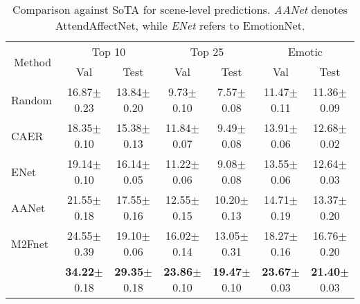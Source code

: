 \begin{table*}[t]
\centering
\tabcolsep=0.07cm
\begin{tabular}{l cc cc cc}
\toprule
\multicolumn{1}{c}{\multirow{2}{*}{Method}} & \multicolumn{2}{c}{Top 10}      & \multicolumn{2}{c}{Top 25}      & \multicolumn{2}{c}{Emotic}      \\
\multicolumn{1}{c}{} & Val   & Test  & Val   & Test  & Val   & Test  \\ \midrule
Random               & 16.87\scriptsize{{$\pm$}0.23} & 13.84\scriptsize{{$\pm$}0.20} & 9.73\scriptsize{{$\pm$}0.10} & 7.57\scriptsize{{$\pm$}0.08} & 11.47\scriptsize{{$\pm$}0.11} & 11.36\scriptsize{{$\pm$}0.09} \\
CAER~\cite{caer}
& 18.35\scriptsize{{$\pm$}0.10} & 15.38\scriptsize{{$\pm$}0.13} & 11.84\scriptsize{{$\pm$}0.07} & 9.49\scriptsize{{$\pm$}0.08}  & 13.91\scriptsize{{$\pm$}0.06} & 12.68\scriptsize{{$\pm$}0.02} \\
ENet~\cite{WeiEmotionNet}
& 19.14\scriptsize{{$\pm$}0.10} & 16.14\scriptsize{{$\pm$}0.05} & 11.22\scriptsize{{$\pm$}0.06} & 9.08\scriptsize{{$\pm$}0.08}  & 13.55\scriptsize{{$\pm$}0.06} & 12.64\scriptsize{{$\pm$}0.03} \\
AANet~\cite{attendaffectnet}
& 21.55\scriptsize{{$\pm$}0.18} & 17.55\scriptsize{{$\pm$}0.16} & 12.55\scriptsize{{$\pm$}0.15} & 10.20\scriptsize{{$\pm$}0.13} & 14.71\scriptsize{{$\pm$}0.19} & 13.37\scriptsize{{$\pm$}0.20} \\
M2Fnet~\cite{m2fnet}
& 24.55\scriptsize{{$\pm$}0.39} & 19.10\scriptsize{{$\pm$}0.06} & 16.02\scriptsize{{$\pm$}0.14} & 13.05\scriptsize{{$\pm$}0.31} & 18.27\scriptsize{{$\pm$}0.16} & 16.76\scriptsize{{$\pm$}0.20} \\
\midrule
\modelname{}  & \textbf{34.22}\scriptsize{{$\pm$}0.18} & \textbf{29.35}\scriptsize{{$\pm$}0.18} & \textbf{23.86}\scriptsize{{$\pm$}0.10} & \textbf{19.47}\scriptsize{{$\pm$}0.10} & \textbf{23.67}\scriptsize{{$\pm$}0.03} & \textbf{21.40}\scriptsize{{$\pm$}0.03} \\ \bottomrule
\end{tabular}
\vspace{-3mm}
\caption{Comparison against SoTA for scene-level predictions. \emph{AANet} denotes AttendAffectNet, while \emph{ENet} refers to EmotionNet.}
\label{tab:sota_scene_abl}
\end{table*}
